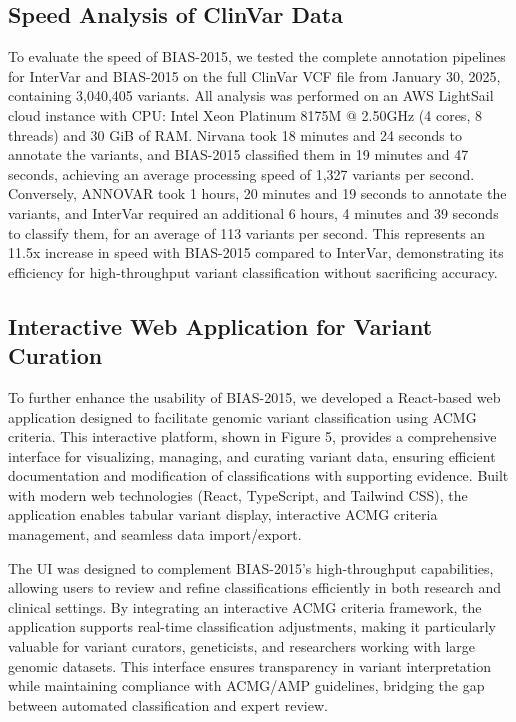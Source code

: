 \documentclass[unnumsec,webpdf,contemporary,large]{oup-authoring-template}
\theoremstyle{thmstyleone}
\theoremstyle{thmstyletwo}
\theoremstyle{thmstylethree}
\begin{document}
\subsection{Speed Analysis of ClinVar Data}
To evaluate the speed of BIAS-2015, we tested the complete annotation pipelines for InterVar and BIAS-2015 on the full ClinVar VCF file from January 30, 2025, containing 3,040,405 variants. All analysis was performed on an AWS LightSail cloud instance with CPU: Intel Xeon Platinum 8175M @ 2.50GHz (4 cores, 8 threads) and 30 GiB of RAM. Nirvana took 18 minutes and 24 seconds to annotate the variants, and BIAS-2015 classified them in 19 minutes and 47 seconds, achieving an average processing speed of 1,327 variants per second. Conversely, ANNOVAR took 1 hours, 20 minutes and 19 seconds to annotate the variants, and InterVar required an additional 6 hours, 4 minutes and 39 seconds to classify them, for an average of 113 variants per second. This represents an 11.5x increase in speed with BIAS-2015 compared to InterVar, demonstrating its efficiency for high-throughput variant classification without sacrificing accuracy.

\subsection{Interactive Web Application for Variant Curation}
To further enhance the usability of BIAS-2015, we developed a React-based web application designed to facilitate genomic variant classification using ACMG criteria. This interactive platform, shown in Figure 5, provides a comprehensive interface for visualizing, managing, and curating variant data, ensuring efficient documentation and modification of classifications with supporting evidence. Built with modern web technologies (React, TypeScript, and Tailwind CSS), the application enables tabular variant display, interactive ACMG criteria management, and seamless data import/export.

The UI was designed to complement BIAS-2015’s high-throughput capabilities, allowing users to review and refine classifications efficiently in both research and clinical settings. By integrating an interactive ACMG criteria framework, the application supports real-time classification adjustments, making it particularly valuable for variant curators, geneticists, and researchers working with large genomic datasets. This interface ensures transparency in variant interpretation while maintaining compliance with ACMG/AMP guidelines, bridging the gap between automated classification and expert review.
\end{document}
